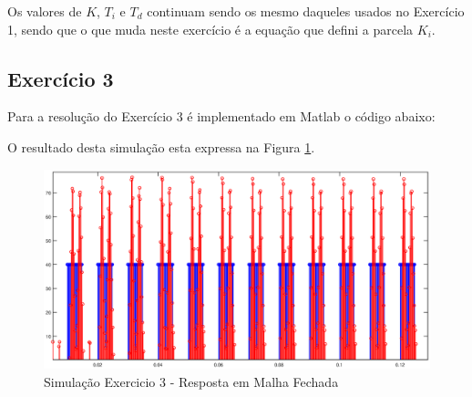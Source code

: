 	Os valores de $K$, $T_i$ e $T_d$ continuam sendo os mesmo daqueles usados no Exercício 1, sendo que o que muda neste exercício é a equação que defini a parcela $K_i$.
	
	\subsection{Exercício 3}
	
	Para a resolução do Exercício 3 é implementado em Matlab o código abaixo:
	
	
	O resultado desta simulação esta expressa na Figura \ref{fig:Exercicio3}.  
	
	\begin{figure}[H]
		\centering
		\includegraphics[scale = .4]{Imagens/ExercicioIII.eps}
		\caption{Simulação Exercicio 3 - Resposta em Malha Fechada}
		\label{fig:Exercicio3}
	\end{figure}